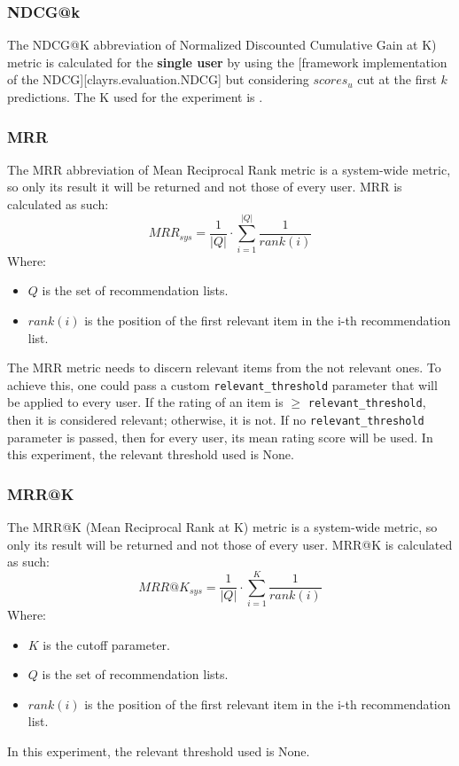 \documentclass[11pt]{article}
\begin{document}
\subsubsection{NDCG@k}\label{subsubsec:ndcg-k}
The NDCG@K abbreviation of Normalized Discounted Cumulative Gain at K) metric is calculated for the \textbf{single user}
by using the [framework implementation of the NDCG][clayrs.evaluation.NDCG] but considering $scores_{u}$ cut at the
first $k$ predictions.
The K used for the experiment is .
\hfill\break
\hfill\break

\subsubsection{MRR}\label{subsubsec:mrr}
The MRR abbreviation of Mean Reciprocal Rank metric is a system-wide metric, so only its result it will be returned
and not those of every user.
MRR is calculated as such:
\hfill\break
\hfill\break
    \[
        MRR_{sys} = \frac{1}{|Q|}\cdot\sum_{i=1}^{|Q|}\frac{1}{rank(i)}
    \]
\hfill\break
\hfill\break
    Where:
\begin{itemize}
    \item $Q$ is the set of recommendation lists.
    \item $rank(i)$ is the position of the first relevant item in the i-th recommendation list.
\end{itemize}
\hfill\break
\hfill\break
The MRR metric needs to discern relevant items from the not relevant ones.
To achieve this, one could pass a custom \texttt{relevant\_threshold} parameter that will be applied to every user.
If the rating of an item is $\geq$ \texttt{relevant\_threshold}, then it is considered relevant; otherwise, it is not.
If no \texttt{relevant\_threshold} parameter is passed, then for every user, its mean rating score will be used.
In this experiment, the relevant threshold used is
None.
\hfill\break
\hfill\break

\subsubsection{MRR@K}\label{subsubsec:mrr-k}
The MRR@K (Mean Reciprocal Rank at K) metric is a system-wide metric, so only its result will be returned and
not those of every user.
MRR@K is calculated as such:
\hfill\break
\hfill\break
    \[
        MRR@K_{sys} = \frac{1}{|Q|}\cdot\sum_{i=1}^{K}\frac{1}{rank(i)}
    \]
\hfill\break
\hfill\break
    Where:
\begin{itemize}
    \item $K$ is the cutoff parameter.
    \item $Q$ is the set of recommendation lists.
    \item $rank(i)$ is the position of the first relevant item in the i-th recommendation list.
\end{itemize}
\hfill\break
\hfill\break
In this experiment, the relevant threshold used is
None.
\hfill\break
\hfill\break
\end{document}
